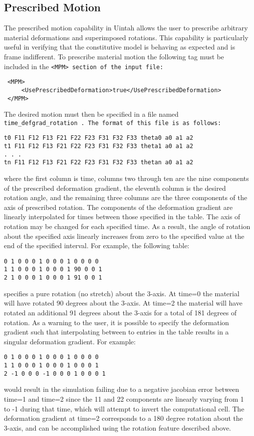 \subsection{Prescribed Motion} \label{Sec:PrescribedMotion} The prescribed motion
capability in Uintah allows the user to prescribe arbitrary material
deformations and superimposed rotations.  This capability is particularly
useful in verifying that the constitutive model is behaving as expected and is
frame indifferent.  To prescribe material motion the following tag must be
included in the \tt <MPM> \normalfont section of the input file:

\begin{Verbatim}
 <MPM>
     <UsePrescribedDeformation>true</UsePrescribedDeformation>
 </MPM>
\end{Verbatim}

The desired motion must then be specified in a file named \tt time\_defgrad\_rotation \normalfont.  The format of this file is as follows:

\begin{Verbatim}
t0 F11 F12 F13 F21 F22 F23 F31 F32 F33 theta0 a0 a1 a2
t1 F11 F12 F13 F21 F22 F23 F31 F32 F33 theta1 a0 a1 a2
. . .
tn F11 F12 F13 F21 F22 F23 F31 F32 F33 thetan a0 a1 a2

\end{Verbatim}
where the first column is time, columns two through ten are the nine components of the prescribed deformation gradient, the eleventh column is the desired rotation angle, and the remaining three columns are the three components of the axis of prescribed rotation.  The components of the deformation gradient are linearly interpolated for times between those specified in the table.  The axis of rotation may be changed for each specified time.  As a result, the angle of rotation about the specified axis linearly increases from zero to the specified value at the end of the specified interval.  For example, the following table:

\begin{Verbatim}
0 1 0 0 0 1 0 0 0 1 0 0 0 0
1 1 0 0 0 1 0 0 0 1 90 0 0 1
2 1 0 0 0 1 0 0 0 1 91 0 0 1
\end{Verbatim}
specifies a pure rotation (no stretch) about the 3-axis.  At time=0 the material will have rotated 90 degrees about the 3-axis.  At time=2 the material will have rotated an additional 91 degrees about the 3-axis for a total of 181 degrees of rotation.  As a warning to the user, it is possible to specify the deformation gradient such that interpolating between to entries in the table results in a singular deformation gradient.  For example:
\begin{Verbatim}
0 1 0 0 0 1 0 0 0 1 0 0 0 0
1 1 0 0 0 1 0 0 0 1 0 0 0 1
2 -1 0 0 0 -1 0 0 0 1 0 0 0 1
\end{Verbatim}
would result in the simulation failing due to a negative jacobian error between time=1 and time=2 since the 11 and 22 components are linearly varying from 1 to -1 during that time, which will attempt to invert the computational cell.  The deformation gradient at time=2 corresponds to a 180 degree rotation about the 3-axis, and can be accomplished using the rotation feature described above.

